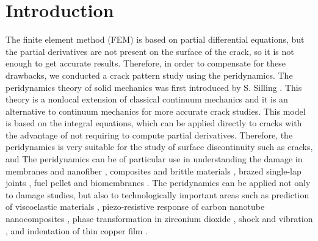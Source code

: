 \section{Introduction}
\label{sec:1}
The finite element method (FEM) is based on partial differential equations, but the partial derivatives are not present on the surface of the crack,
so it is not enough to get accurate results.
Therefore, in order to compensate for these drawbacks, we conducted a crack pattern study using the peridynamics.
The peridynamics theory of solid mechanics was first introduced by S. Silling \cite{Ref1,Ref2,Ref3,Ref4}.
This theory is a nonlocal extension of classical continuum mechanics and it is an alternative to continuum mechanics for more accurate crack studies.
This model is based on the integral equations, which can be applied directly to cracks with the advantage of not requiring to compute partial derivatives.
Therefore, the peridynamics is very suitable for the study of surface discontinuity such as cracks, and
{}
The peridynamics can be of particular use in understanding the damage in membranes and nanofiber \cite{Ref5}, composites and brittle materials \cite{Ref6}, brazed single-lap joints \cite{Ref7}, fuel pellet \cite{Ref8} and biomembranes \cite{Ref9}.
The peridynamics can be applied not only to damage studies, but also to technologically important areas such as prediction of viscoelastic materials \cite{Ref10}, piezo-resistive response of carbon nanotube nanocomposites \cite{Ref11}, phase transformation in zirconium dioxide \cite{Ref12}, shock and vibration \cite{Ref13}, and indentation of thin copper film \cite{Ref14}.
